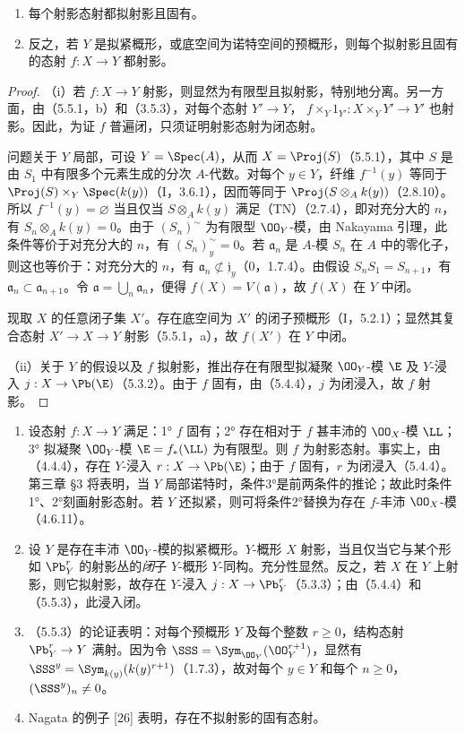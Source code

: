 \begin{enumerate}[label=\textup{(\roman*)}]
\item 每个射影态射都拟射影且固有。
\item 反之，若 $Y$ 是拟紧概形，或底空间为诺特空间的预概形，则每个拟射影且固有的态射 $f:X\to Y$ 都射影。
\end{enumerate}
\begin{proof}
（i）若 $f:X\to Y$ 射影，则显然为有限型且拟射影，特别地分离。另一方面，由（5.5.1，b）和（3.5.3），对每个态射 $Y'\to Y$，
$f\times_Y1_{Y'}:X\times_Y Y'\to Y'$ 也射影。因此，为证 $f$ 普遍闭，只须证明射影态射为闭态射。

问题关于 $Y$ 局部，可设 $Y=\Spec(A)$，从而 $X=\Proj(S)$（5.5.1），其中 $S$ 是由 $S_1$ 中有限多个元素生成的分次 $A$-代数。对每个 $y\in Y$，纤维 $f^{-1}(y)$ 等同于
$\Proj(S)\times_Y\Spec(k(y))$（I，3.6.1），因而等同于
$\Proj(S\otimes_A k(y))$（2.8.10）。所以 $f^{-1}(y)=\varnothing$ 当且仅当 $S\otimes_A k(y)$ 满足（TN）（2.7.4），即对充分大的 $n$，有
$S_n\otimes_A k(y)=0$。由于 $(S_n)^\sim$ 为有限型 $\OO_Y$-模，由 Nakayama 引理，此条件等价于对充分大的 $n$，有 $(S_n)^\sim_y=0$。若 $\mathfrak a_n$ 是 $A$-模 $S_n$ 在 $A$ 中的零化子，则这也等价于：对充分大的 $n$，有 $\mathfrak a_n\not\subset\mathfrak j_y$（0，1.7.4）。由假设 $S_nS_1=S_{n+1}$，有 $\mathfrak a_n\subset\mathfrak a_{n+1}$。令 $\mathfrak a=\bigcup_n\mathfrak a_n$，便得
$f(X)=V(\mathfrak a)$，故 $f(X)$ 在 $Y$ 中闭。

现取 $X$ 的任意闭子集 $X'$。存在底空间为 $X'$ 的闭子预概形（I，5.2.1）；显然其复合态射 $X'\to X\to Y$ 射影（5.5.1，a），故 $f(X')$ 在 $Y$ 中闭。

（ii）关于 $Y$ 的假设以及 $f$ 拟射影，推出存在有限型拟凝聚 $\OO_Y$-模 $\E$ 及 $Y$-浸入 $j:X\to\Pb(\E)$（5.3.2）。由于 $f$ 固有，由（5.4.4），$j$ 为闭浸入，故 $f$ 射影。
\end{proof}

\begin{enumerate}[label=\textup{(\roman*)}]
\item 设态射 $f:X\to Y$ 满足：1° $f$ 固有；2° 存在相对于 $f$ 甚丰沛的 $\OO_X$-模 $\LL$；3° 拟凝聚 $\OO_Y$-模 $\E=f_*(\LL)$ 为有限型。则 $f$ 为射影态射。事实上，由（4.4.4），存在 $Y$-浸入 $r:X\to\Pb(\E)$；由于 $f$ 固有，$r$ 为闭浸入（5.4.4）。第三章 §3 将表明，当 $Y$ 局部诺特时，条件3°是前两条件的推论；故此时条件1°、2°刻画射影态射。若 $Y$ 还拟紧，则可将条件2°替换为存在 $f$-丰沛 $\OO_X$-模（4.6.11）。
\item 设 $Y$ 是存在丰沛 $\OO_Y$-模的拟紧概形。$Y$-概形 $X$ 射影，当且仅当它与某个形如 $\Pb_Y^r$ 的射影丛的\emph{闭}子 $Y$-概形 $Y$-同构。充分性显然。反之，若 $X$ 在 $Y$ 上射影，则它拟射影，故存在 $Y$-浸入 $j:X\to\Pb_Y^r$（5.3.3）；由（5.4.4）和（5.5.3），此浸入闭。
\item （5.5.3）的论证表明：对每个预概形 $Y$ 及每个整数 $r\geq0$，结构态射 $\Pb_Y^r\to Y$ 满射。因为令 $\SSS=\Sym_{\OO_Y}(\OO_Y^{r+1})$，显然有
$\SSS^y=\Sym_{k(y)}(k(y)^{r+1})$（1.7.3），故对每个 $y\in Y$ 和每个 $n\geq0$，$(\SSS^y)_n\ne0$。
\item Nagata 的例子 [26] 表明，存在不拟射影的固有态射。
\end{enumerate}

